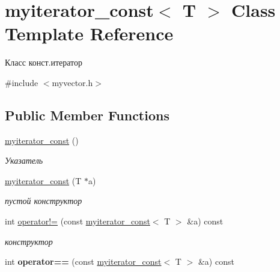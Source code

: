 \hypertarget{classmyiterator__const}{}\section{myiterator\+\_\+const$<$ T $>$ Class Template Reference}
\label{classmyiterator__const}


Класс конст.\+итератор  




{\ttfamily \#include $<$myvector.\+h$>$}

\subsection*{Public Member Functions}
\begin{DoxyCompactItemize}
\item 
\hypertarget{classmyiterator__const_a1b351f1cddf36212aa80e67a6cc977ae}{}\hyperlink{classmyiterator__const_a1b351f1cddf36212aa80e67a6cc977ae}{myiterator\+\_\+const} ()\label{classmyiterator__const_a1b351f1cddf36212aa80e67a6cc977ae}

\begin{DoxyCompactList}\small\item\em Указатель \end{DoxyCompactList}\item 
\hypertarget{classmyiterator__const_ad20bdb6912ed67a3bbb48a5e4cee7b26}{}\hyperlink{classmyiterator__const_ad20bdb6912ed67a3bbb48a5e4cee7b26}{myiterator\+\_\+const} (T $\ast$a)\label{classmyiterator__const_ad20bdb6912ed67a3bbb48a5e4cee7b26}

\begin{DoxyCompactList}\small\item\em пустой конструктор \end{DoxyCompactList}\item 
\hypertarget{classmyiterator__const_ae0c1b5b29d4c15bc3a9db9446689d42e}{}int \hyperlink{classmyiterator__const_ae0c1b5b29d4c15bc3a9db9446689d42e}{operator!=} (const \hyperlink{classmyiterator__const}{myiterator\+\_\+const}$<$ T $>$ \&a) const \label{classmyiterator__const_ae0c1b5b29d4c15bc3a9db9446689d42e}

\begin{DoxyCompactList}\small\item\em конструктор \end{DoxyCompactList}\item 
\hypertarget{classmyiterator__const_aa19268b87745f9c381c604fa151cf749}{}int {\bfseries operator==} (const \hyperlink{classmyiterator__const}{myiterator\+\_\+const}$<$ T $>$ \&a) const \label{classmyiterator__const_aa19268b87745f9c381c604fa151cf749}


\end{DoxyCompactItemize}

